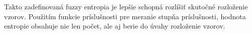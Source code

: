 Takto zadefinovaná fuzzy entropia je lepšie schopná rozlíšiť skutočné rozloženie vzorov. Použitím funkcie príslušnosti pre meranie stupňa príslušnosti, hodnota entropie obsahuje nie len počet, ale aj berie do úvahy rozloženie vzorov.  \cite{lee2001}




























